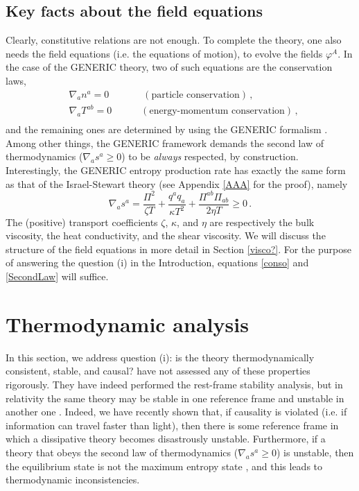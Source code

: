 \documentclass[a4paper, amsfonts, amssymb, amsmath, reprint, showkeys, nofootinbib, twoside, onecolumn, notitlepage]{revtex4-1}
\newcommand{\spc}{\quad \quad \quad}
\theoremstyle{definition}
\theoremstyle{theorem}
\begin{document}
\subsection{Key facts about the field equations}

Clearly, constitutive relations are not enough. To complete the theory, one also needs the field equations (i.e. the equations of motion), to evolve the fields $\varphi^A$. 
In the case of the GENERIC theory, two of such equations are the conservation laws,
\begin{equation}\label{conso}
\begin{split}
& \nabla_a n^a =0 \spc \, \, \, (\text{particle conservation}) \, , \\
& \nabla_a T^{ab} =0 \spc (\text{energy-momentum conservation}) \, , \\
\end{split}
\end{equation} 
and the remaining ones are determined by using the GENERIC formalism \cite{Grmela1997}. Among other things, the GENERIC framework demands the second law of thermodynamics ($\nabla_a s^a \geq 0$) to be \textit{always} respected, by construction. 
Interestingly, the GENERIC entropy production rate has exactly the same form as that of the Israel-Stewart theory (see Appendix \ref{AAA} for the proof), namely \cite{Hishcock1983}
\begin{equation}\label{SecondLaw}
\nabla_a s^a = \dfrac{\Pi^2}{\zeta T} +\dfrac{q^a q_a}{\kappa T^2} + \dfrac{\Pi^{ab}\Pi_{ab}}{2\eta T} \geq 0 \, .
\end{equation}
The (positive) transport coefficients $\zeta$, $\kappa$, and $\eta$ are respectively the bulk viscosity, the heat conductivity, and the shear viscosity. We will discuss the structure of the field equations in more detail in Section \ref{visco?}. For the purpose of answering the question (i) in the Introduction, equations \eqref{conso} and \eqref{SecondLaw} will suffice.

\section{Thermodynamic analysis}
\label{sec:thermo}

In this section, we address question (i): is the theory thermodynamically consistent, stable, and causal? \citet{Stricker2019} have not assessed any of these properties rigorously. They have indeed performed the rest-frame stability analysis, but in relativity the same theory may be stable in one reference frame and unstable in another one \cite{Hiscock_Insatibility_first_order}. Indeed, we have recently shown \cite{GavassinoSuperlum2021} that, if causality is violated (i.e. if information can travel faster than light), then there is some reference frame in which a dissipative theory becomes disastrously unstable. Furthermore, if a theory that obeys the second law of thermodynamics ($\nabla_a s^a \geq 0$) is unstable, then the equilibrium state is not the maximum entropy state \cite{GavassinoLyapunov_2020,GavassinoGibbs2021}, and this leads to thermodynamic inconsistencies. 
\end{document}
